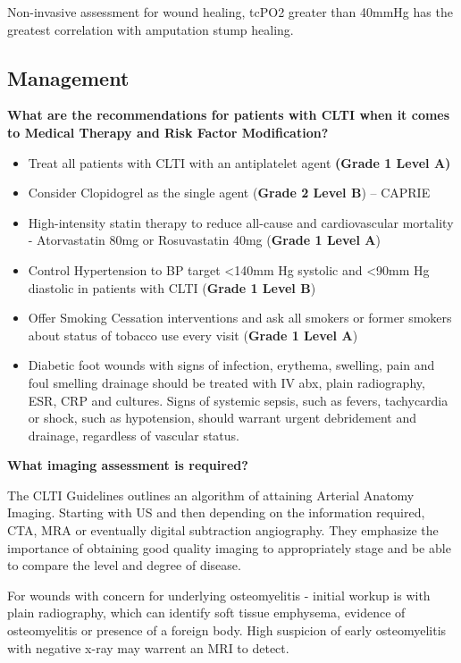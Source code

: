 \documentclass[
]{book}
\begin{document}
Non-invasive assessment for wound healing, tcPO2 greater than 40mmHg has
the greatest correlation with amputation stump healing.\citep{malone1987}

\hypertarget{management-18}{%
\subsection{Management}\label{management-18}}

\textbf{What are the recommendations for patients with CLTI when it comes to
Medical Therapy and Risk Factor Modification?}

\begin{itemize}
\item
  Treat all patients with CLTI with an antiplatelet agent \textbf{(Grade 1
  Level A)}
\item
  Consider Clopidogrel as the single agent (\textbf{Grade 2 Level B}) --
  CAPRIE\citep{capriesteeringcommittee1996}
\item
  High-intensity statin therapy to reduce all-cause and cardiovascular
  mortality - Atorvastatin 80mg or Rosuvastatin 40mg (\textbf{Grade 1 Level
  A}) \citep{arya2018, 2013acc}
\item
  Control Hypertension to BP target \textless140mm Hg systolic and \textless90mm Hg
  diastolic in patients with CLTI (\textbf{Grade 1 Level B})
\item
  Offer Smoking Cessation interventions and ask all smokers or former
  smokers about status of tobacco use every visit (\textbf{Grade 1 Level
  A})
\item
  Diabetic foot wounds with signs of infection, erythema, swelling,
  pain and foul smelling drainage should be treated with IV abx, plain
  radiography, ESR, CRP and cultures. Signs of systemic sepsis, such
  as fevers, tachycardia or shock, such as hypotension, should warrant
  urgent debridement and drainage, regardless of vascular status.
\end{itemize}

\textbf{What imaging assessment is required?}

The CLTI Guidelines outlines an algorithm of attaining Arterial Anatomy
Imaging. Starting with US and then depending on the information
required, CTA, MRA or eventually digital subtraction angiography. They
emphasize the importance of obtaining good quality imaging to
appropriately stage and be able to compare the level and degree of
disease.

For wounds with concern for underlying osteomyelitis - initial workup is
with plain radiography, which can identify soft tissue emphysema,
evidence of osteomyelitis or presence of a foreign body. High suspicion
of early osteomyelitis with negative x-ray may warrent an MRI to
detect.\citep{giurato2017}
\end{document}

